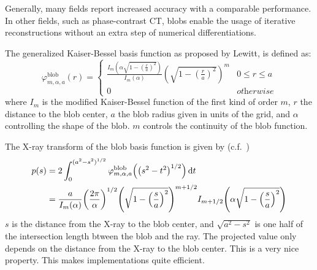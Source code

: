 
Generally, many fields report increased accuracy with a comparable performance. In other fields,
such as phase-contrast CT, blobs enable the usage of iterative reconstructions without an extra step
of numerical differentiations.

The generalized Kaiser-Bessel basis function as proposed by Lewitt, is defined as:
\begin{equation}\label{eq:blob_basis_fn}
	\varphi^{\text{blob}}_{m, \alpha, a}(r) =
	\begin{cases}
		\frac{I_m\left( \alpha \sqrt{1 - \left(\frac{r}{a}\right)^2} \right)} {I_m\left( \alpha \right)} \left( \sqrt{1 - \left(\frac{r}{a}\right)^2}\right)^m & 0 \le r \le a      \\
		0                                                                                                                                                      & \textit{otherwise}
	\end{cases}
\end{equation}
where \(I_m\) is the modified Kaiser-Bessel function of the first kind of order \(m\), \(r\) the
distance to the blob center, \(a\) the blob radius given in units of the grid, and \(\alpha\)
controlling the shape of the blob. \(m\) controls the continuity of the blob function.

The X-ray transform of the blob basis function is given by
(c.f.~\cite{lewitt_multidimensional_1990,lewitt_alternatives_1992})
\begin{align}\label{eq:radon_blob_basis}
	p(s) & = 2 \int_0^{(a^2-s^2)^{1 / 2}} \varphi^{\text{blob}}_{m, \alpha, a}\left(\left(s^2 - t^2\right)^{1/2}\right) \diff t                                                                                \\
	     & = \frac{a}{I_m(\alpha)} \left( \frac{2\pi}{\alpha}\right)^{1/2} \left( \sqrt{1 - \left(\frac{s}{a}\right)^2} \right)^{m + 1/2} I_{m+1/2}\left( \alpha \sqrt{1 - \left(\frac{s}{a}\right)^2} \right)
\end{align}
\(s\) is the distance from the X-ray to the blob center, and \(\sqrt{a^2 - s^2}\) is one half of the
intersection length btween the blob and the ray. The projected value only depends on the distance
from the X-ray to the blob center. This is a very nice property. This makes implementations quite
efficient.


